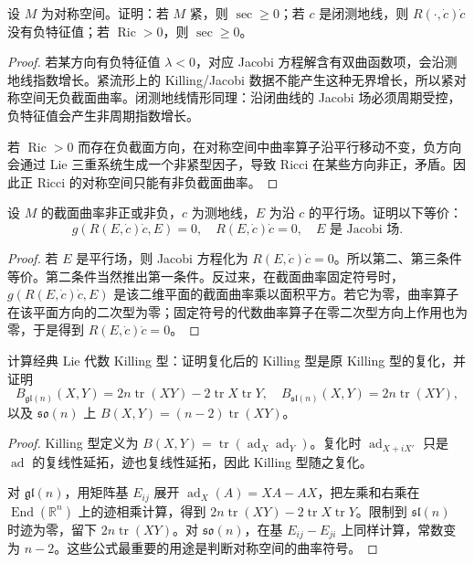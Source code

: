 \documentclass[11pt,a4paper,openany]{ctexbook}
\numberwithin{equation}{chapter}
\begin{document}
\begin{exercise}
设 \(M\) 为对称空间。证明：若 \(M\) 紧，则 \(\sec\ge0\)；若 \(c\) 是闭测地线，则 \(R(\cdot,\dot c)\dot c\) 没有负特征值；若 \(\operatorname{Ric}>0\)，则 \(\sec\ge0\)。
\end{exercise}
\begin{proof}
若某方向有负特征值 \(\lambda<0\)，对应 Jacobi 方程解含有双曲函数项，会沿测地线指数增长。紧流形上的 Killing/Jacobi 数据不能产生这种无界增长，所以紧对称空间无负截面曲率。闭测地线情形同理：沿闭曲线的 Jacobi 场必须周期受控，负特征值会产生非周期指数增长。

若 \(\operatorname{Ric}>0\) 而存在负截面方向，在对称空间中曲率算子沿平行移动不变，负方向会通过 Lie 三重系统生成一个非紧型因子，导致 Ricci 在某些方向非正，矛盾。因此正 Ricci 的对称空间只能有非负截面曲率。
\end{proof}

\begin{exercise}
设 \(M\) 的截面曲率非正或非负，\(c\) 为测地线，\(E\) 为沿 \(c\) 的平行场。证明以下等价：
\[
g(R(E,\dot c)\dot c,E)=0,\quad R(E,\dot c)\dot c=0,\quad E\text{ 是 Jacobi 场}.
\]
\end{exercise}
\begin{proof}
若 \(E\) 是平行场，则 Jacobi 方程化为 \(R(E,\dot c)\dot c=0\)。所以第二、第三条件等价。第二条件当然推出第一条件。反过来，在截面曲率固定符号时，\(g(R(E,\dot c)\dot c,E)\) 是该二维平面的截面曲率乘以面积平方。若它为零，曲率算子在该平面方向的二次型为零；固定符号的代数曲率算子在零二次型方向上作用也为零，于是得到 \(R(E,\dot c)\dot c=0\)。
\end{proof}

\begin{exercise}
计算经典 Lie 代数 Killing 型：证明复化后的 Killing 型是原 Killing 型的复化，并证明
\[
B_{\mathfrak{gl}(n)}(X,Y)=2n\operatorname{tr}(XY)-2\operatorname{tr}X\operatorname{tr}Y,\quad
B_{\mathfrak{sl}(n)}(X,Y)=2n\operatorname{tr}(XY),
\]
以及 \(\mathfrak{so}(n)\) 上 \(B(X,Y)=(n-2)\operatorname{tr}(XY)\)。
\end{exercise}
\begin{proof}
Killing 型定义为 \(B(X,Y)=\operatorname{tr}(\operatorname{ad}_X\operatorname{ad}_Y)\)。复化时 \(\operatorname{ad}_{X+iX'}\) 只是 \(\operatorname{ad}\) 的复线性延拓，迹也复线性延拓，因此 Killing 型随之复化。

对 \(\mathfrak{gl}(n)\)，用矩阵基 \(E_{ij}\) 展开 \(\operatorname{ad}_X(A)=XA-AX\)，把左乘和右乘在 \(\operatorname{End}(\mathbb R^n)\) 上的迹相乘计算，得到 \(2n\operatorname{tr}(XY)-2\operatorname{tr}X\operatorname{tr}Y\)。限制到 \(\mathfrak{sl}(n)\) 时迹为零，留下 \(2n\operatorname{tr}(XY)\)。对 \(\mathfrak{so}(n)\)，在基 \(E_{ij}-E_{ji}\) 上同样计算，常数变为 \(n-2\)。这些公式最重要的用途是判断对称空间的曲率符号。
\end{proof}
\end{document}
